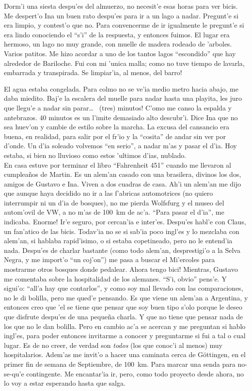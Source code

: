 Dorm'i una siesta despu'es del almuerzo, no necesit'e esas horas para ver bicis.
Me despert'o Ina un buen rato despu'es para ir a un lago a nadar. Pregunt'e si
era limpio, y contest'o que no. Para convencerme de ir igualmente le pregunt'e
si era lindo conociendo el ``s'i'' de la respuesta, y entonces fuimos. El lugar
era hermoso, un lago no muy grande, con muelle de madera rodeado de 'arboles.
Varios patitos. Me hizo acordar a uno de los tantos lagos ``escondido'' que hay
alrededor de Bariloche. Fui con mi 'unica malla; como no tuve tiempo de lavarla,
embarrada y transpirada. \textexclamdown Se limpiar'ia, al menos, del barro!

El agua estaba congelada. Para colmo no se ve'ia medio metro hacia abajo, me
daba miedito. Baj'e la escalera del muelle para nadar hasta una playita, les
juro que llegu'e a nadar sin parar\ldots\  (tres) minutos!
C'omo me canso la espalda y antebrazos. 40 minutos es un l'imite demasiado alto
descubr'i. Dice Ina que no sea huev'on y cambie de estilo sobre la marcha. La
excusa del cansancio era buena, en realidad, para salir por el fr'io y la
``cosita'' de andar sin ver por d'onde. Un d'ia soleado volvemos ``en serio'', a
nadar m'as y pasar el d'ia. Hoy estaba, si bien no lluvioso como estos 'ultimos
d'ias, nublado.\\

En casa estuve por terminar el libro ``Fahrenheit 451'' cuando me llevaron al
cumplea\~nos de Martin. Es un alem'an casado con una brasilera, divinos los dos,
amigos de Gustavo e Ina. Viven a dos cuadras de casa. Ah'i un alem'an me dijo
que aunque haya decidido no ir a las f'abricas automotrices (no quiero
interrumpir ni un d'ia de bosques), no me pierda Wolfsfurg y el museo del
autom'ovil de {\small VW}, a no m'as de 100~km de ac'a. ``Para pasar el d'ia'',
me indicaba. \textexclamdown Enorme! Ir'e seguro, por cercan'ia e inter'es.
Despu'es habl'e con Claus, un fan'atico de las bicis. Todav'ia no se si sab'ia
poco ingl'es y lo mezclaba con alem'an, si hablaba rapid'isimo, o si estaba
copetineado, pero no le entend'ia nada. Despu'es de charlar bastante (como todo
alem'an, desprestigi'o a la Selva Negra, y me import'o ``un coj'on'') me pasa a
buscar el Mi'ercoles para mostrarme otros bosques donde pedalear.
\textexclamdown Ahora tengo bici! Mientras, Gustavo me comentaba sobre la
hospitalidad de los alemanes. ``S'i, obvio'' pens'e. Y sigui'o: ``all'a hay que
contarlos'', y como soy mal llevado con las comparaciones, no le di bolilla,
pero me qued'e pensando. Es que viene un alem'an a Argentina, y entonces creo
que 'el se tiene que pensar que soy buen tipo s'olo porque le deseo que disfrute
despu'es de una peque\~na charla. Y que no tiene que pensar nada de los que no
le dan bolilla. Pero en cambio ac'a se acercan y me preguntan si hablo ingl'es,
para poder entonces invitarme a conocer y preguntarme si fui a tal o cual lugar.
Es de no creer, de verdad son \emph{todos} (los que conoc'i al menos) muy
hospitalarios. Adem'as me invit'o a hacer una caminata cerca de G\"ottingen, en
el primer fin de semana de Septiembre, de 100~km. Para marcar una senda para
no-se-qu'e contingente. Me encantar'ia ir, pero, como todo proyecto desde ahora,
no lo voy a estar esperando hasta que salga.

